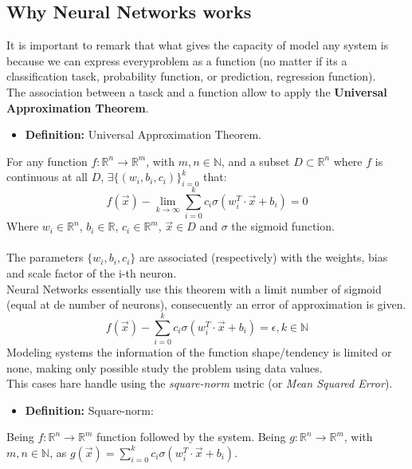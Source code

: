 \documentclass[a4paper, 11pt]{article}
\begin{document}
\subsection{Why Neural Networks works}
It is important to remark that what gives the capacity of model any system is because we can express everyproblem as a function (no matter if its a classification tasck, probability function, or prediction, regression function).\\
The association between a tasck and a function allow to apply the \textbf{Universal Approximation Theorem}.\\
\hline
\begin{itemize}
    \item \textbf{Definition:} Universal Approximation Theorem.
\end{itemize}  
For any function $f:\mathbb{R}^n \rightarrow \mathbb{R}^m$, with $m,n\in\mathbb{N}$, and a subset $D\subset \mathbb{R}^n$ where $f$ is continuous at all $D$, 
$\exists \{(w_i, b_i, c_i)\}_{i = 0}^k$ that: 
$$f(\vec{x}) - \lim_{k \rightarrow \infty} \sum_{i=0}^{k} c_i \sigma \left( w_i^T \cdot \vec{x} + b_i \right) = 0$$
Where $w_i \in \mathbb{R}^n$, $b_i\in \mathbb{R}$, $c_i \in \mathbb{R}^m$, $\vec{x}\in D$ and $\sigma$ the sigmoid function.\\
\hline\\\vspace{0.5em}
\hspace{-1.6em}The parameters $\{w_i, b_i, c_i\}$ are associated (respectively) with the weights, bias and scale factor of the i-th neuron.\\
Neural Networks essentially use this theorem with a limit number of sigmoid (equal at de number of neurons), consecuently an error of approximation is given.
$$f(\vec{x})-\sum_{i=0}^{k} c_i \sigma \left( w_i^T \cdot \vec{x} + b_i \right) = \epsilon, k \in \mathbb{N}$$
Modeling systems the information of the function shape/tendency is limited or none, making only possible study the problem using data values.\\
This cases hare handle using the \textit{square-norm} metric (or \textit{Mean Squared Error}).\\
\hline
\begin{itemize}
    \item \textbf{Definition:} Square-norm: 
\end{itemize}
Being $f:\mathbb{R}^n \rightarrow \mathbb{R}^m$ function followed by the system.
Being $g:\mathbb{R}^n \rightarrow \mathbb{R}^m$, with $m,n\in\mathbb{N}$, as $g(\vec{x}) = \sum_{i=0}^{k} c_i \sigma \left( w_i^T \cdot \vec{x} + b_i \right)$.\\
\end{document}
